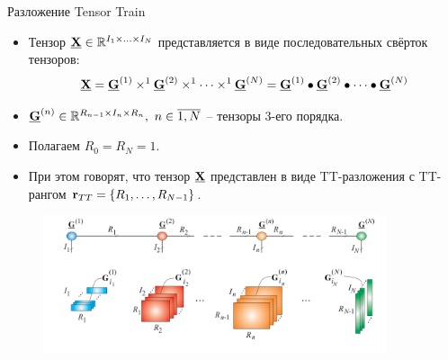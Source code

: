 \begin{frame}{Разложение Tensor Train}
\begin{itemize}
\item Тензор $\underline{\textbf{X}} \in \mathbb{R}^{I_1 \times ...\times I_N}$ представляется в виде последовательных свёрток тензоров:
$$ \underline{\textbf{X}} = \underline{\textbf{G}}^{(1)} \times^1 \underline{\textbf{G}}^{(2)} \times^1 \dots \times^1 \underline{\textbf{G}}^{(N)} = \underline{\textbf{G}}^{(1)} \bullet \underline{\textbf{G}}^{(2)} \bullet \dots \bullet \underline{\textbf{G}}^{(N)}
$$
\item $\underline{\textbf{G}}^{(n)} \in \mathbb{R}^{R_{n-1}\times I_n \times R_n}, \ n \in \overline{1,N}$ -- тензоры 3-его порядка.
\item Полагаем $R_0 = R_N = 1$.
\item При этом говорят, что тензор $\underline{\textbf{X}}$ представлен в виде TT-разложения с TT-рангом $\textbf{r}_{TT} = \{R_1, \dots, R_{N-1} \}$.
\end{itemize}
\vspace{0.2cm}
\begin{figure}
    \centering
    \includegraphics[width=0.9\textwidth]{lecture_15/figs/TT.png}
\end{figure}
\end{frame}
